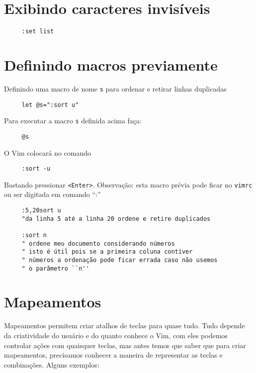 \section{Exibindo caracteres invisíveis}
\label{Exibindo caracteres invisíveis}

\begin{verbatim}
     :set list
\end{verbatim}

\section{Definindo macros previamente}
\label{Definindo macros previamente}
Definindo uma macro de nome \verb|s| para ordenar e retirar linhas duplicadas

\begin{verbatim}
     let @s=":sort u"
\end{verbatim}

Para executar a macro \verb|s| definida acima faça:

\begin{verbatim}
     @s
\end{verbatim}

O Vim colocará no comando

\begin{verbatim}
     :sort -u
\end{verbatim}

Bastando pressionar \verb|<Enter>|.
Observação: esta macro prévia pode ficar no {\tt vimrc} ou ser digitada em comando ``:''


\begin{verbatim}
     :5,20sort u
     "da linha 5 até a linha 20 ordene e retire duplicados
     
     :sort n
     " ordene meu documento considerando números
     " isto é útil pois se a primeira coluna contiver
     " números a ordenação pode ficar errada caso não usemos
     " o parâmetro ``n''
\end{verbatim}

\section{Mapeamentos}\label{Mapeamentos}

Mapeamentos permitem criar atalhos de teclas para quase tudo. Tudo depende da
criatividade do usuário e do quanto conhece o Vim, com eles podemos controlar ações
com quaisquer teclas, mas antes temos que saber que para criar mapeamentos,
precisamos conhecer a maneira de representar as teclas e combinações. Alguns
exemplos:

